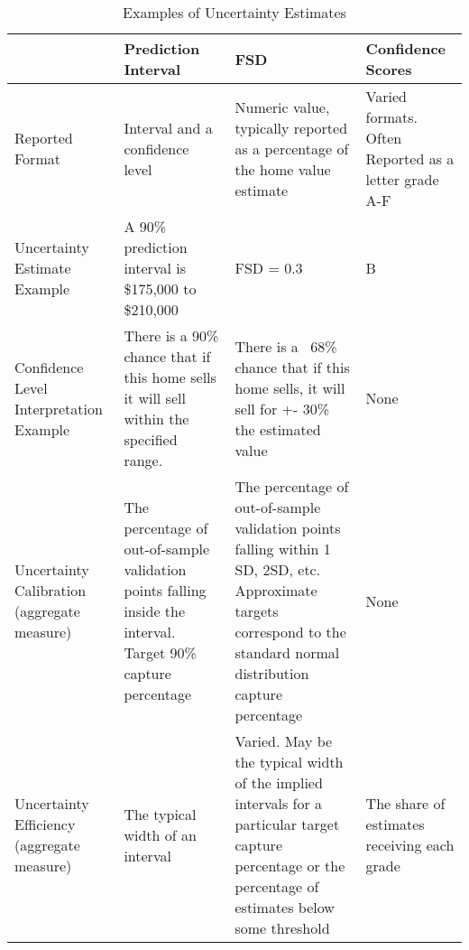 \documentclass[colTwo]{anon}
\theoremstyle{definition}
\begin{document}
\begin{table*}[h!]
\centering
\begin{tabular}{|p{2.8cm} | p{3.6cm} | p{3.6cm} | p{3.6cm} |} 
 \hline
  & \textbf{Prediction Interval} & \textbf{FSD} & \textbf{Confidence Scores} \\ [0.5ex] 
 \hline\hline
 Reported Format & Interval and a confidence level & Numeric value, typically reported as a percentage of the home value estimate & Varied formats. Often Reported as a letter grade A-F \\ \hline
 Uncertainty Estimate Example & A 90\% prediction interval is \$175,000 to \$210,000 & FSD = 0.3 & B \\
 \hline
Confidence Level Interpretation Example & There is a 90\% chance that if this home sells it will sell within the specified range. & There is a ~68\% chance that if this home sells, it will sell for +- 30\% the estimated value & None \\
\hline
Uncertainty Calibration
(aggregate measure) & The percentage of out-of-sample validation points falling inside the interval. Target 90\% capture percentage & The percentage of out-of-sample validation points falling within 1 SD, 2SD, etc. Approximate targets correspond to the standard normal distribution capture percentage & None \\
\hline
 Uncertainty Efficiency
(aggregate measure)
 & The typical width of an interval & Varied. May be the typical width of the implied intervals for a particular target capture percentage or the percentage of estimates below some threshold & The share of estimates receiving each grade \\ [1ex] 
 \hline
\end{tabular}
\caption{Examples of Uncertainty Estimates}
\label{table:1}
\end{table*}
\end{document}

